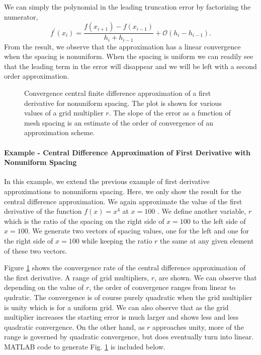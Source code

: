 We can simply the polynomial in the leading truncation error by factorizing the numerator,
\begin{equation}
     \boxed{f^{\prime}\left(x_{i}\right) = \frac{f\left(x_{i+1}\right) -  f\left(x_{i-1}\right)}{h_{i} + h_{i-1}} +  
     \mathcal{O}\left(h_{i} - h_{i-1}\right).}
  \label{eq:fdm_non_central1}
\end{equation}
From the result, we observe that the approximation has a linear convergence when the spacing is nonuniform.  When
the spacing is uniform we can readily see that the leading term in the error will disappear and we will be left with a
second order approximation.

\begin{figure}[t]
\sidecaption[t]
\scalebox{0.5}{}
\caption{Convergence central finite difference approximation of  a first derivative for nonuniform spacing. The plot is shown for various values of a grid multiplier $r$. The slope of the error as a function of mesh spacing is an estimate of the order of convergence of an approximation scheme.}
\label{fig:fdm_nonuni_1}
\end{figure}

\paragraph{Example - Central Difference Approximation of First Derivative with Nonuniform Spacing}
In this example, we extend the previous example of first derivative approximations to nonuniform spacing. Here, we
only show the result for the central difference approximation.  We again approximate the value of the first derivative of
the function  $f\left(x\right) = x^{4}$ at $x=100$ .  We define another variable, $r$ which is the ratio of the spacing on
the right side of $x=100$ to the left side of $x=100$.  We generate two vectors of spacing values, one for the left and one
for the right side of $x=100$ while keeping the ratio $r$ the same at any given element of these two vectors.
\par
Figure \ref{fig:fdm_nonuni_1} shows the convergence rate of the central difference approximation of the first derivative. A range of grid multipliers, $r$, are shown.  We can observe that depending on the value of $r$, the order of convergence 
ranges from linear to qudratic.  The convergence is of course purely quadratic when the grid multiplier is unity which is for a
uniform grid. We can also observe that as the grid multiplier increases the starting error is much larger and shows less and 
less quadratic convergence.  On the other hand, as $r$ approaches unity, more of the range is governed by quadratic
convergence, but does eventually turn into linear. MATLAB code to generate Fig. \ref{fig:fdm_nonuni_1} is included below.


